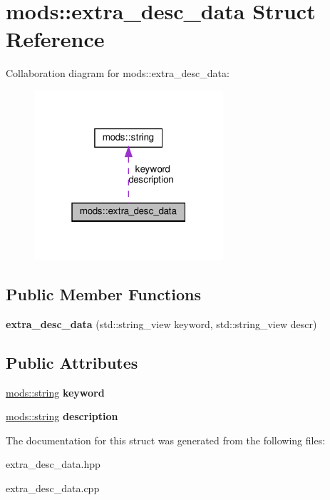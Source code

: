 \hypertarget{structmods_1_1extra__desc__data}{}\section{mods\+:\+:extra\+\_\+desc\+\_\+data Struct Reference}
\label{structmods_1_1extra__desc__data}


Collaboration diagram for mods\+:\+:extra\+\_\+desc\+\_\+data\+:\nopagebreak
\begin{figure}[H]
\begin{center}
\leavevmode
\includegraphics[width=199pt]{structmods_1_1extra__desc__data__coll__graph}
\end{center}
\end{figure}
\subsection*{Public Member Functions}
\begin{DoxyCompactItemize}
\item 
\mbox{\label{structmods_1_1extra__desc__data_a9ed858e026c2758021493e1a22af94aa}} 
{\bfseries extra\+\_\+desc\+\_\+data} (std\+::string\+\_\+view keyword, std\+::string\+\_\+view descr)
\end{DoxyCompactItemize}
\subsection*{Public Attributes}
\begin{DoxyCompactItemize}
\item 
\mbox{\label{structmods_1_1extra__desc__data_ae50b26f6a46a5025f87c74b0252ef9b1}} 
\hyperlink{structmods_1_1string}{mods\+::string} {\bfseries keyword}
\item 
\mbox{\label{structmods_1_1extra__desc__data_a2f6b66a9508aae2c367b5c7a21c94e06}} 
\hyperlink{structmods_1_1string}{mods\+::string} {\bfseries description}
\end{DoxyCompactItemize}


The documentation for this struct was generated from the following files\+:\begin{DoxyCompactItemize}
\item 
extra\+\_\+desc\+\_\+data.\+hpp\item 
extra\+\_\+desc\+\_\+data.\+cpp\end{DoxyCompactItemize}
